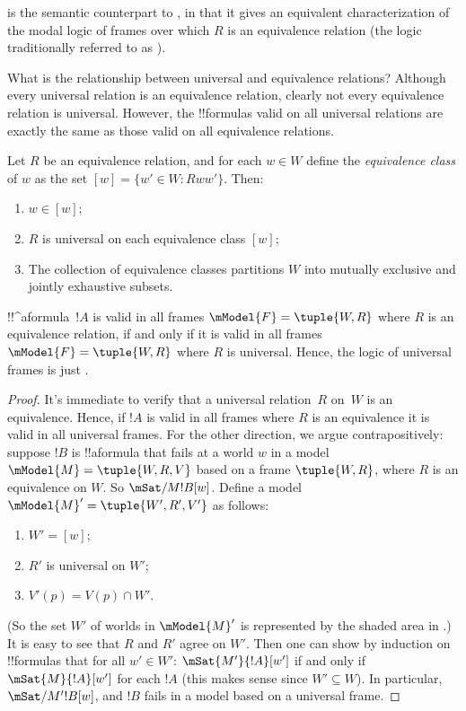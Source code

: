 \documentclass[../../../include/open-logic-section]{subfiles}
\begin{document}
 is the semantic counterpart to
, in that it gives an equivalent characterization of
the modal logic of frames over which $R$ is an equivalence relation (the logic
traditionally referred to as ).

What is the relationship between universal and equivalence relations?
Although every universal relation is an equivalence relation, clearly
not every equivalence relation is universal. However, the !!{formula}s
valid on all universal relations are exactly the same as those valid
on all equivalence relations.

\begin{prop}
  Let $R$ be an equivalence relation, and for each $w \in W$ define
  the \emph{equivalence class} of $w$ as the set $[w] = \{w'\in W :
  Rww'\}$. Then:
  \begin{enumerate}
  \item $w \in [w]$;
  \item $R$ is universal on each equivalence class $[w]$;
  \item The collection of equivalence classes partitions $W$ into mutually
    exclusive and jointly exhaustive subsets.
  \end{enumerate}
\end{prop}

\begin{prop}
  !!^a{formula}~$!A$ is valid in all frames $\mModel{F} =\tuple{W,R}$
  where $R$ is an equivalence relation, if and only if it is valid in
  all frames $\mModel{F} =\tuple{W,R}$ where $R$ is universal. Hence,
  the logic of universal frames is just .
\end{prop}

\begin{proof}
  It's immediate to verify that a universal relation~$R$ on~$W$ is an
  equivalence. Hence, if $!A$ is valid in all frames where $R$ is an
  equivalence it is valid in all universal frames. For the other
  direction, we argue contrapositively: suppose $!B$ is !!a{formula}
  that fails at a world $w$ in a model $\mModel{M} = \tuple{W, R, V}$
  based on a frame $\tuple{W,R}$, where $R$ is an equivalence on
  $W$. So $\mSat/{M}{!B}[w]$. Define a model $\mModel{M}' = \tuple{W',
    R', V'}$ as follows:
  \begin{enumerate}
  \item $W' = [w]$;
  \item $R'$ is universal on $W'$;
  \item $V'(p) = V(p) \cap W'$. 
  \end{enumerate}
  (So the set $W'$ of worlds in $\mModel{M}'$ is represented by the
  shaded area in .)  It is easy to see
  that $R$ and $R'$ agree on $W'$. Then one can show by induction on
  !!{formula}s that for all $w' \in W'$: $\mSat{M'}{!A}[w']$ if and
  only if $\mSat{M}{!A}[w']$ for each $!A$ (this makes sense since $W'
  \subseteq W$). In particular, $\mSat/{M'}{!B}[w]$, and $!B$ fails in
  a model based on a universal frame.
\end{proof}
\end{document}
